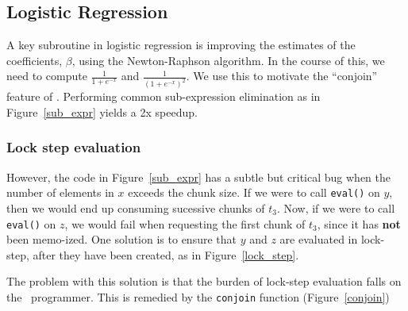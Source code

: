 \subsection{Logistic Regression}

A key subroutine in logistic regression \cite{Hastie2009} is improving the 
estimates of the
coefficients, \(\beta\), using the Newton-Raphson algorithm.
In the course of this, we need to compute
\(\frac{1}{1 + e^{-x}}\) and 
\(\frac{1}{(1 + e^{-x})^2}\).
We use this to motivate the ``conjoin'' feature of \Q.
Performing common sub-expression elimination as in 
Figure~\ref{sub_expr} yields a 2x speedup.

\begin{figure}
\centering
{}
\end{figure}


\subsubsection{Lock step evaluation}
However, the code in Figure~\ref{sub_expr} has a subtle but
critical bug when the number of elements in \(x\) exceeds the chunk
size.  If we were to call {\tt eval()} on \(y\), then we would
end up consuming sucessive chunks of \(t_3\). Now, if we were to call
{\tt eval()} on \(z\), we would fail when requesting the first
chunk of \(t_3\), since it has {\bf not} been memo-ized. One solution
is to ensure that \(y\) and \(z\) are evaluated in lock-step, after they have
been created, as in Figure~\ref{lock_step}.
\begin{figure}
\centering
{}
\end{figure}

The problem with this solution is that the burden of lock-step evaluation falls
on the \Q\ programmer. This is remedied by the {\tt conjoin} function
(Figure~\ref{conjoin})

\begin{figure}
\centering
{}
\end{figure}

